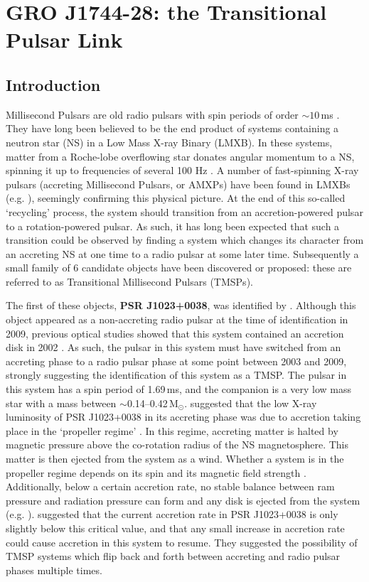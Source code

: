 \chapter{GRO J1744-28: the Transitional Pulsar Link}

\section{Introduction}

\par Millisecond Pulsars are old radio pulsars with spin periods of order $\sim10$\,ms \citep{Backer_MSP}.  They have long been believed to be the end product of systems containing a neutron star (NS) in a Low Mass X-ray Binary (LMXB).  In these systems, matter from a Roche-lobe overflowing star donates angular momentum to a NS, spinning it up to frequencies of several 100 Hz \citep{Alpar_MSP}.  A number of fast-spinning X-ray pulsars (accreting Millisecond Pulsars, or AMXPs) have been found in LMXBs (e.g. \citealp{Wijnands_XRPulsar,Altamirano_Broken,Patruno_AllAMXPs,Sanna_AMXP}), seemingly confirming this physical picture.  At the end of this so-called `recycling' process, the system should transition from an accretion-powered pulsar to a rotation-powered pulsar.  As such, it has long been expected that such a transition could be observed by finding a system which changes its character from an accreting NS at one time to a radio pulsar at some later time.  Subsequently a small family of 6 candidate objects have been discovered or proposed: these are referred to as Transitional Millisecond Pulsars (TMSPs).
\par The first of these objects, \textbf{PSR J1023+0038}, was identified by \citealp{Archibald_Link}.  Although this object appeared as a non-accreting radio pulsar at the time of identification in 2009, previous optical studies showed that this system contained an accretion disk in 2002 \citep{Szkody_1023Accretion}.  As such, the pulsar in this system must have switched from an accreting phase to a radio pulsar phase at some point between 2003 and 2009, strongly suggesting the identification of this system as a TMSP.  The pulsar in this system has a spin period of 1.69\,ms, and the companion is a very low mass star with a mass between $\sim$0.14--0.42\,M$_\odot$.  \citealp{Archibald_Link} suggested that the low X-ray luminosity of PSR J1023+0038 in its accreting phase was due to accretion taking place in the `propeller regime' \citep{Illarionov_Propellor}.  In this regime, accreting matter is halted by magnetic pressure above the co-rotation radius of the NS magnetosphere.  This matter is then ejected from the system as a wind.  Whether a system is in the propeller regime depends on its spin and its magnetic field strength \citep{Lewin_QPORev}.  Additionally, below a certain accretion rate, no stable balance between ram pressure and radiation pressure can form and any disk is ejected from the system (e.g. \citealp{Campana_NoDisk}).  \citealp{Archibald_Link} suggested that the current accretion rate in PSR J1023+0038 is only slightly below this critical value, and that any small increase in accretion rate could cause accretion in this system to resume.  They suggested the possibility of TMSP systems which flip back and forth between accreting and radio pulsar phases multiple times.

